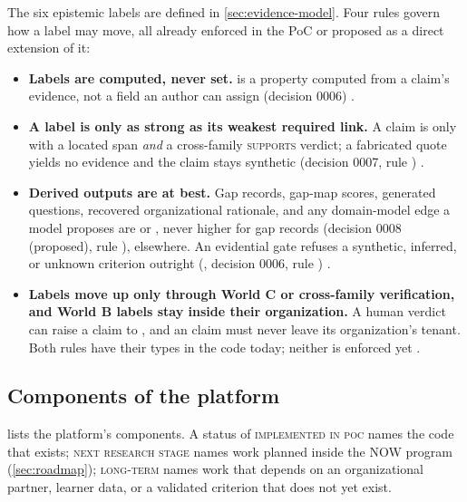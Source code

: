 The six epistemic labels are defined in \cref{sec:evidence-model}. Four rules govern how a label
may move, all already enforced in the PoC or proposed as a direct extension of it:

\begin{itemize}[noitemsep]
  \item \textbf{Labels are computed, never set.}  is a property computed
    from a claim's evidence, not a field an author can assign (decision 0006) \evobs.
  \item \textbf{A label is only as strong as its weakest required link.} A claim is
     only with a located span \emph{and} a cross-family
    \textsc{supports} verdict; a fabricated quote yields no evidence and the claim stays synthetic
    (decision 0007, rule ) \evobs.
  \item \textbf{Derived outputs are  at best.} Gap records, gap-map scores,
    generated questions, recovered organizational rationale, and any domain-model edge a model
    proposes are  or , never higher \evobs{} for gap
    records (decision 0008 (proposed), rule ), \evfut{}
    elsewhere. An evidential gate refuses a synthetic, inferred, or unknown
    criterion outright (, decision 0006, rule
    ) \evobs.
  \item \textbf{Labels move up only through World C or cross-family verification, and World B
    labels stay inside their organization.} A human verdict can raise a claim to
    , and an  claim must
    never leave its organization's tenant. Both rules have their types in the code today; neither
    is enforced yet \evfut.
\end{itemize}

\subsection{Components of the platform}
\label{sec:platform-components}

 lists the platform's components. A status of \textsc{implemented in poc}
names the code that exists; \textsc{next research stage} names work planned inside the NOW
program (\cref{sec:roadmap}); \textsc{long-term} names work that depends on an organizational
partner, learner data, or a validated criterion that does not yet exist.

